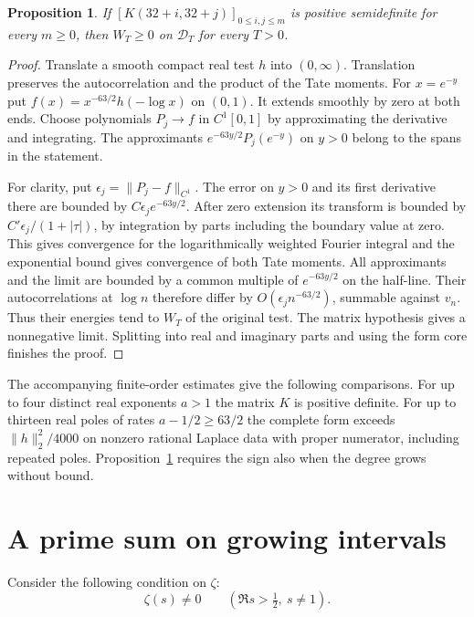 \documentclass[11pt]{amsart}
\newtheorem{proposition}[theorem]{Proposition}
\theoremstyle{definition}
\theoremstyle{remark}
\begin{document}
\begin{proposition}\label{ladder}
If $[K(32+i,32+j)]_{0\le i,j\le m}$ is positive semidefinite for every
$m\ge0$, then $W_T\ge0$ on $\mathcal D_T$ for every $T>0$.
\end{proposition}
\begin{proof}
Translate a smooth compact real test $h$ into $(0,\infty)$. Translation
preserves the autocorrelation and the product of the Tate moments. For
$x=e^{-y}$ put $f(x)=x^{-63/2}h(-\log x)$ on $(0,1)$. It extends smoothly
by zero at both ends. Choose polynomials $P_j\to f$ in $C^1[0,1]$ by
approximating the derivative and integrating. The approximants
$e^{-63y/2}P_j(e^{-y})$ on $y>0$ belong to the spans in the statement.

For clarity, put $\epsilon_j=\|P_j-f\|_{C^1}$. The error on $y>0$ and its
first derivative there are bounded by $C\epsilon_j e^{-63y/2}$.
After zero extension its transform is bounded by
$C'\epsilon_j/(1+|\tau|)$, by integration by parts including the boundary
value at zero. This gives convergence for the logarithmically weighted
Fourier integral and the exponential bound gives convergence of both Tate
moments. All approximants and the limit are bounded by a common multiple
of $e^{-63y/2}$ on the half-line. Their autocorrelations at $\log n$
therefore differ by $O(\epsilon_j n^{-63/2})$, summable against $v_n$.
Thus their energies tend to $W_T$ of the original test. The matrix
hypothesis gives a nonnegative limit. Splitting into real and imaginary
parts and using the form core finishes the proof.
\end{proof}

The accompanying finite-order estimates give the following comparisons. For up to four distinct real exponents $a>1$ the matrix $K$ is positive
definite. For up to thirteen real poles of rates
$a-1/2\ge63/2$ the complete form exceeds $\|h\|_2^2/4000$ on nonzero
rational Laplace data with proper numerator, including repeated poles. Proposition~\ref{ladder} requires the sign also
when the degree grows without bound.

\section{A prime sum on growing intervals}
\setlength{\abovedisplayskip}{7pt plus 2pt minus 2pt}
\setlength{\belowdisplayskip}{7pt plus 2pt minus 2pt}
Consider the following condition on $\zeta$:
\begin{equation}\label{eq:dirichlet-input}
 \zeta(s)\ne0\qquad (\Re s>\tfrac12,\ s\ne1).
\end{equation}
\end{document}
